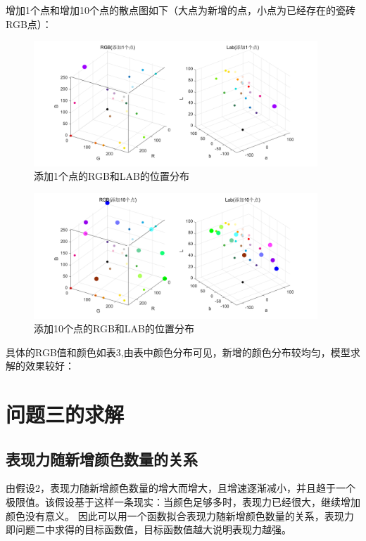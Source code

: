 \documentclass{article}
\begin{document}
增加1个点和增加10个点的散点图如下（大点为新增的点，小点为已经存在的瓷砖RGB点）：
   \begin{figure}[H]
	\centering
	\includegraphics[width=0.95\textwidth]{img/添加1个点.png}
	\caption{添加1个点的RGB和LAB的位置分布}
	\label{添加1个点}
\end{figure}
   \begin{figure}[H]
	\centering
	\includegraphics[width=0.95\textwidth]{img/添加10个点.png}
	\caption{添加10个点的RGB和LAB的位置分布}
	\label{添加10个点}
\end{figure}

具体的RGB值和颜色如表3,由表中颜色分布可见，新增的颜色分布较均匀，模型求解的效果较好：

 
 
 \section{问题三的求解}
 \subsection{表现力随新增颜色数量的关系}
 由假设2，表现力随新增颜色数量的增大而增大，且增速逐渐减小，并且趋于一个极限值。该假设基于这样一条现实：当颜色足够多时，表现力已经很大，继续增加颜色没有意义。
 因此可以用一个函数拟合表现力随新增颜色数量的关系，表现力即问题二中求得的目标函数值，目标函数值越大说明表现力越强。
 
\end{document}
